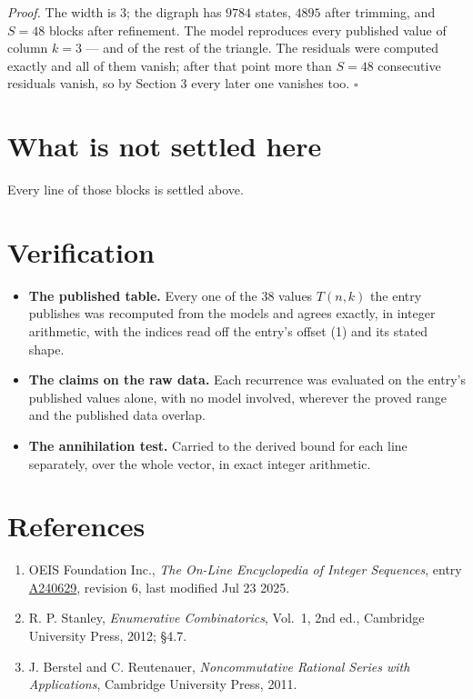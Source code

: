 \documentclass[11pt]{article}
\theoremstyle{definition}
\begin{document}
{\itshape Proof.} The width is $3$; the digraph has $9784$ states, $4895$ after trimming, and $S = 48$ blocks after refinement. The model reproduces every published value of column $k = 3$ --- and of the rest of the triangle. The residuals were computed exactly and all of them vanish; after that point more than $S = 48$ consecutive residuals vanish, so by Section 3 every later one vanishes too. $\square$

\section{What is not settled here}

Every line of those blocks is settled above.

\section{Verification}

\begin{itemize}

\item {\bfseries The published table.} Every one of the 38 values $T(n,k)$ the entry publishes was recomputed from the models and agrees exactly, in integer arithmetic, with the indices read off the entry's offset (1) and its stated shape.

\item {\bfseries The claims on the raw data.} Each recurrence was evaluated on the entry's published values alone, with no model involved, wherever the proved range and the published data overlap.

\item {\bfseries The annihilation test.} Carried to the derived bound for each line separately, over the whole vector, in exact integer arithmetic.

\end{itemize}

\section{References}

\begin{enumerate}

\item OEIS Foundation Inc., \emph{The On-Line Encyclopedia of Integer Sequences}, entry \href{https://oeis.org/A240629}{A240629}, revision 6, last modified Jul 23 2025.

\item R. P. Stanley, \emph{Enumerative Combinatorics}, Vol.~1, 2nd ed., Cambridge University Press, 2012; \S4.7.

\item J. Berstel and C. Reutenauer, \emph{Noncommutative Rational Series with Applications}, Cambridge University Press, 2011.

\end{enumerate}
\end{document}
